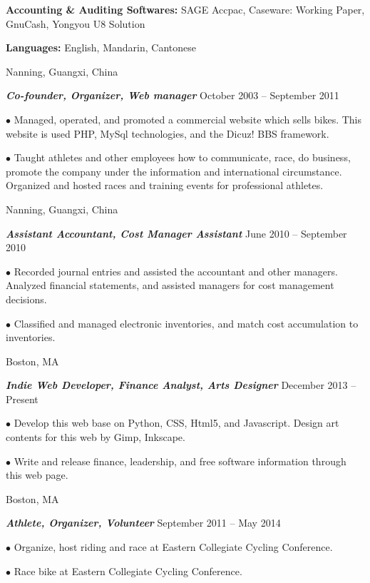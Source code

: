 \documentclass[10pt]{article}
\begin{document}
\noindent
{\bf Accounting \& Auditing Softwares:} SAGE Accpac, Caseware: Working Paper, GnuCash, Yongyou U8 Solution

\noindent
{\bf Languages:} English, Mandarin, Cantonese

\medskip


  \hfill Nanning, Guangxi, China

\noindent \textit{\textbf{Co-founder, Organizer, Web manager}} \hfill October 2003 -- September 2011

\hangindent=0.7cm $\bullet$ Managed, operated, and promoted a commercial website which sells bikes. This website is used PHP, MySql technologies, and the Dicuz! BBS framework.

\hangindent=0.7cm $\bullet$ Taught athletes and other employees how to communicate, race, do business, promote the company under the information and international circumstance. Organized and hosted races and training events for professional athletes.

\medskip

 \hfill Nanning, Guangxi, China

\noindent \textit{\textbf{Assistant Accountant, Cost Manager Assistant}} \hfill June 2010 -- September 2010

\hangindent=0.7cm $\bullet$ Recorded journal entries and assisted the accountant and other managers. Analyzed financial statements, and assisted managers for cost management decisions.

\hangindent=0.7cm $\bullet$ Classified and managed electronic inventories, and match cost accumulation to inventories.

\medskip


 \hfill Boston, MA

\noindent \textit{\textbf{Indie Web Developer, Finance Analyst, Arts Designer}} \hfill December 2013 -- Present

\hangindent=0.7cm $\bullet$ Develop this web base on Python, CSS, Html5, and Javascript. Design art contents for this web by Gimp, Inkscape.

\hangindent=0.7cm $\bullet$ Write and release finance, leadership, and free software information through this web page.

\medskip

 \hfill Boston, MA

\noindent \textit{\textbf{Athlete, Organizer, Volunteer}} \hfill September 2011 -- May 2014

\hangindent=0.7cm $\bullet$ Organize, host riding and race at Eastern Collegiate Cycling Conference.

\hangindent=0.7cm $\bullet$ Race bike at Eastern Collegiate Cycling Conference.
\end{document}
